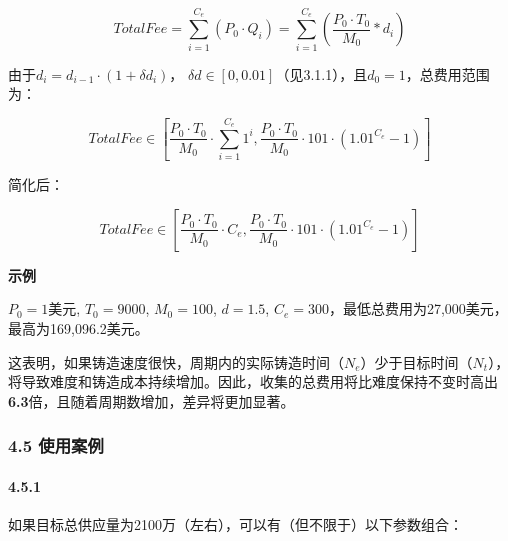 \documentclass[
]{article}
\begin{document}
\begin{equation}
TotalFee = \sum_{i=1}^{C_e}(P_0 \cdot Q_i)=\sum_{i=1}^{C_e}(\frac{P_0 \cdot T_0}{M_0}*d_i)
\end{equation}

由于\(d_i = d_{i-1} \cdot (1 + \delta d_i)\)，
\(\delta d \in [0,0.01]\)（见3.1.1），且\(d_0=1\)，总费用范围为：

\begin{equation}
TotalFee \in [\frac{P_0 \cdot T_0}{M_0} \cdot \sum_{i=1}^{C_e}1^i, \frac{P_0 \cdot T_0}{M_0} \cdot 101 \cdot (1.01^{C_e}-1)]
\end{equation}

简化后：

\begin{equation}
TotalFee \in [\frac{P_0 \cdot T_0}{M_0} \cdot C_e, \frac{P_0 \cdot T_0}{M_0} \cdot 101 \cdot (1.01^{C_e}-1)]
\end{equation}

\textbf{示例}

\(P_0=1\)美元, \(T_0=9000\), \(M_0=100\), \(d=1.5\),
\(C_e=300\)，最低总费用为27,000美元，最高为169,096.2美元。

这表明，如果铸造速度很快，周期内的实际铸造时间（\(N_e\)）少于目标时间（\(N_t\)），将导致难度和铸造成本持续增加。因此，收集的总费用将比难度保持不变时高出\textbf{6.3}倍，且随着周期数增加，差异将更加显著。

\subsubsection{4.5 使用案例}\label{ux4f7fux7528ux6848ux4f8b}

\paragraph{4.5.1}\label{section-3}

如果目标总供应量为2100万（左右），可以有（但不限于）以下参数组合：
\end{document}
